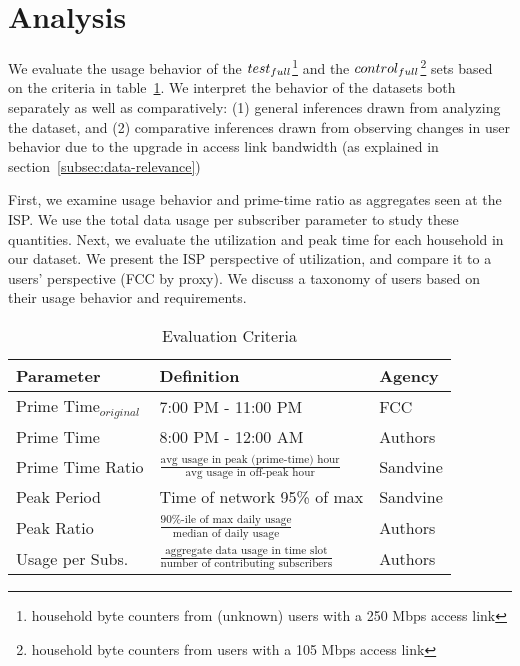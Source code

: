 \section{Analysis}
\label{sec:results}

We evaluate the usage behavior of the $test_{full}$\footnote{household byte counters
from (unknown) users with a 250 Mbps access link}  and the $control_{full}$\footnote{household
byte counters from users with a 105 Mbps access link} sets based
on the criteria in table~\ref{tab:eval-criteria}. We interpret the behavior of the datasets
both separately as well as comparatively: (1) general inferences drawn from analyzing the dataset,
and (2) comparative inferences drawn from observing changes in user behavior due to the upgrade
in access link bandwidth (as explained in section~\ref{subsec:data-relevance})

First, we examine usage behavior and prime-time ratio as aggregates seen at the ISP. We use 
the total data usage per subscriber parameter to study these quantities. Next, we
evaluate the utilization and peak time for each household in our dataset. We present the ISP
perspective of utilization, and compare it to a users' perspective (FCC by proxy). We discuss
a taxonomy of users based on their usage behavior and requirements. %


\begin{table}[ht!]
\small 
\begin{tabular}{|l|l|l|}
\hline
\textbf{Parameter}				& \textbf{Definition}				& \textbf{Agency}  \\ \hline
Prime Time$_{original}$			& 7:00 PM - 11:00 PM				& FCC       \\
Prime Time       				& 8:00 PM - 12:00 AM                & Authors       \\
Prime Time Ratio 				& \( \frac{ \text{avg usage in peak (prime-time) hour}}{ \text{avg usage in off-peak hour}}\) 												& Sandvine  \\
Peak Period						& Time of network 95\% of max      	& Sandvine \\
Peak Ratio       				& \(\frac{\text{90\%-ile of max daily usage}}{\text{median of daily usage}}\)                											& Authors \\
Usage per Subs.       			& \(\frac{\text{aggregate data usage in time slot}}{\text{number of contributing subscribers}}\)                											& Authors \\ \hline
\end{tabular}
\caption{Evaluation Criteria}
\label{tab:eval-criteria}
\end{table}





%